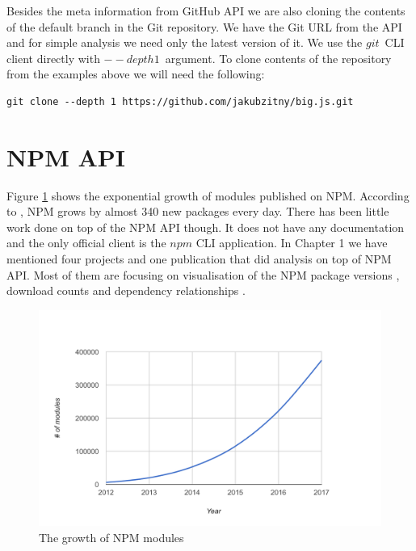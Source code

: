 \documentclass[thesis=M,english]{FITthesis}[2012/10/20]
\begin{document}
Besides the meta information from GitHub API we are also cloning the contents of the default branch in the Git repository. We have the Git URL from the API and for simple analysis we need only the latest version of it. We use the $git$ CLI client directly with $--depth 1$ argument. To clone contents of the repository from the examples above we will need the following: \\

\lstset{title=Git CLI command to get latest repository without history}
\begin{lstlisting}[basicstyle=\small]
git clone --depth 1 https://github.com/jakubzitny/big.js.git
\end{lstlisting}


\section{NPM API}

Figure \ref{fig: npm_counts} shows the exponential growth of modules published on NPM. According to \cite{modulecounts}, NPM grows by almost 340 new packages every day. There has been little work done on top of the NPM API though. It does not have any documentation and the only official client is the $npm$ CLI application. In Chapter 1 we have mentioned four projects and one publication \cite{js_dynamics} that did analysis on top of NPM API. Most of them are focusing on visualisation of the NPM package versions \cite{npm_by_numbers}, download counts \cite{npm_stats, npm_stat, js_dynamics} and dependency relationships \cite{js_dynamics, npm_discover}. \\

\begin{center}
\begin{figure}[h!]
	\includegraphics[totalheight=225pt]{images/npm_counts.png}
	\caption{The growth of NPM modules}
	\label{fig: npm_counts}
\end{figure}
\end{center}
\end{document}
